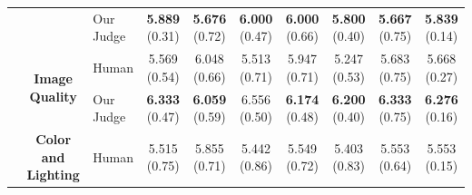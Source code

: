 \documentclass{article}
\begin{document}
\begin{center}
{\begin{tabular}{@{}c c l c c c c c c c@{}}
 & & Our Judge & \cellcolor{greendark}\textbf{5.889} {\fontsize{7.2pt}{8.6pt}\selectfont\textcolor{stdgray}{(0.31)}} & \cellcolor{greendark}\textbf{5.676} {\fontsize{7.2pt}{8.6pt}\selectfont\textcolor{stdgray}{(0.72)}} & \cellcolor{greenlight}\textbf{6.000} {\fontsize{7.2pt}{8.6pt}\selectfont\textcolor{stdgray}{(0.47)}} & \cellcolor{greendark}\textbf{6.000} {\fontsize{7.2pt}{8.6pt}\selectfont\textcolor{stdgray}{(0.66)}} & \cellcolor{greenlight}\textbf{5.800} {\fontsize{7.2pt}{8.6pt}\selectfont\textcolor{stdgray}{(0.40)}} & \cellcolor{greendark}\textbf{5.667} {\fontsize{7.2pt}{8.6pt}\selectfont\textcolor{stdgray}{(0.75)}} & \cellcolor{greendark}\textbf{5.839} {\fontsize{7.2pt}{8.6pt}\selectfont\textcolor{stdgray}{(0.14)}} \\
\cmidrule{2-10}
 & \multirow{2}{*}{\textcolor{grpQuality}{\textbf{Image Quality}}} & Human & 5.569 {\fontsize{7.2pt}{8.6pt}\selectfont\textcolor{stdgray}{(0.54)}} & 6.048 {\fontsize{7.2pt}{8.6pt}\selectfont\textcolor{stdgray}{(0.66)}} & 5.513 {\fontsize{7.2pt}{8.6pt}\selectfont\textcolor{stdgray}{(0.71)}} & 5.947 {\fontsize{7.2pt}{8.6pt}\selectfont\textcolor{stdgray}{(0.71)}} & 5.247 {\fontsize{7.2pt}{8.6pt}\selectfont\textcolor{stdgray}{(0.53)}} & 5.683 {\fontsize{7.2pt}{8.6pt}\selectfont\textcolor{stdgray}{(0.75)}} & 5.668 {\fontsize{7.2pt}{8.6pt}\selectfont\textcolor{stdgray}{(0.27)}} \\
 & & Our Judge & \cellcolor{greenlight}\textbf{6.333} {\fontsize{7.2pt}{8.6pt}\selectfont\textcolor{stdgray}{(0.47)}} & \cellcolor{greendark}\textbf{6.059} {\fontsize{7.2pt}{8.6pt}\selectfont\textcolor{stdgray}{(0.59)}} & 6.556 {\fontsize{7.2pt}{8.6pt}\selectfont\textcolor{stdgray}{(0.50)}} & \cellcolor{greendark}\textbf{6.174} {\fontsize{7.2pt}{8.6pt}\selectfont\textcolor{stdgray}{(0.48)}} & \cellcolor{greenlight}\textbf{6.200} {\fontsize{7.2pt}{8.6pt}\selectfont\textcolor{stdgray}{(0.40)}} & \cellcolor{greenlight}\textbf{6.333} {\fontsize{7.2pt}{8.6pt}\selectfont\textcolor{stdgray}{(0.75)}} & \cellcolor{greenlight}\textbf{6.276} {\fontsize{7.2pt}{8.6pt}\selectfont\textcolor{stdgray}{(0.16)}} \\
\cmidrule{2-10}
 & \multirow{2}{*}{\textcolor{grpQuality}{\textbf{Color and Lighting}}} & Human & 5.515 {\fontsize{7.2pt}{8.6pt}\selectfont\textcolor{stdgray}{(0.75)}} & 5.855 {\fontsize{7.2pt}{8.6pt}\selectfont\textcolor{stdgray}{(0.71)}} & 5.442 {\fontsize{7.2pt}{8.6pt}\selectfont\textcolor{stdgray}{(0.86)}} & 5.549 {\fontsize{7.2pt}{8.6pt}\selectfont\textcolor{stdgray}{(0.72)}} & 5.403 {\fontsize{7.2pt}{8.6pt}\selectfont\textcolor{stdgray}{(0.83)}} & 5.553 {\fontsize{7.2pt}{8.6pt}\selectfont\textcolor{stdgray}{(0.64)}} & 5.553 {\fontsize{7.2pt}{8.6pt}\selectfont\textcolor{stdgray}{(0.15)}} \\

\end{tabular}}
\end{center}
\end{document}
